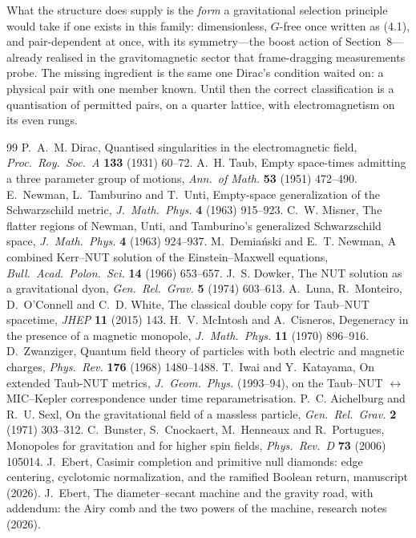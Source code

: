 \documentclass[11pt]{article}
\numberwithin{equation}{section}
\begin{document}
What the structure does supply is the \emph{form} a gravitational
selection principle would take if one exists in this family: dimensionless,
$G$-free once written as (4.1), and pair-dependent at once, with its
symmetry---the boost action of Section~8---already realised in the
gravitomagnetic sector that frame-dragging measurements probe. The missing
ingredient is the same one Dirac's condition waited on: a physical pair
with one member known. Until then the correct classification is a
quantisation of permitted pairs, on a quarter lattice, with electromagnetism
on its even rungs.

\begin{thebibliography}{99}
 P.~A.~M. Dirac, Quantised singularities in the
electromagnetic field, \emph{Proc.\ Roy.\ Soc.\ A} \textbf{133} (1931)
60--72.
 A.~H. Taub, Empty space-times admitting a three parameter
group of motions, \emph{Ann.\ of Math.} \textbf{53} (1951) 472--490.
 E.~Newman, L.~Tamburino and T.~Unti, Empty-space
generalization of the Schwarzschild metric, \emph{J.\ Math.\ Phys.}
\textbf{4} (1963) 915--923.
 C.~W. Misner, The flatter regions of Newman, Unti, and
Tamburino's generalized Schwarzschild space, \emph{J.\ Math.\ Phys.}
\textbf{4} (1963) 924--937.
 M.~Demia\'nski and E.~T. Newman, A combined Kerr--NUT
solution of the Einstein--Maxwell equations, \emph{Bull.\ Acad.\ Polon.\
Sci.} \textbf{14} (1966) 653--657.
 J.~S. Dowker, The NUT solution as a gravitational dyon,
\emph{Gen.\ Rel.\ Grav.} \textbf{5} (1974) 603--613.
 A.~Luna, R.~Monteiro, D.~O'Connell and C.~D. White, The
classical double copy for Taub--NUT spacetime, \emph{JHEP} \textbf{11}
(2015) 143.
 H.~V. McIntosh and A.~Cisneros, Degeneracy in the presence
of a magnetic monopole, \emph{J.\ Math.\ Phys.} \textbf{11} (1970)
896--916.
 D.~Zwanziger, Quantum field theory of particles with
both electric and magnetic charges, \emph{Phys.\ Rev.} \textbf{176}
(1968) 1480--1488.
 T.~Iwai and Y.~Katayama, On extended Taub-NUT metrics,
\emph{J.\ Geom.\ Phys.} (1993--94), on the Taub--NUT $\leftrightarrow$
MIC--Kepler correspondence under time reparametrisation.
 P.~C. Aichelburg and R.~U. Sexl, On the gravitational field
of a massless particle, \emph{Gen.\ Rel.\ Grav.} \textbf{2} (1971)
303--312.
 C.~Bunster, S.~Cnockaert, M.~Henneaux and R.~Portugues,
Monopoles for gravitation and for higher spin fields, \emph{Phys.\ Rev.\
D} \textbf{73} (2006) 105014.
\bibitem{EbertCas} J.~Ebert, Casimir completion and primitive null
diamonds: edge centering, cyclotomic normalization, and the ramified
Boolean return, manuscript (2026).
\bibitem{EbertSecant} J.~Ebert, The diameter--secant machine and the
gravity road, with addendum: the Airy comb and the two powers of the
machine, research notes (2026).
\end{thebibliography}
\end{document}
